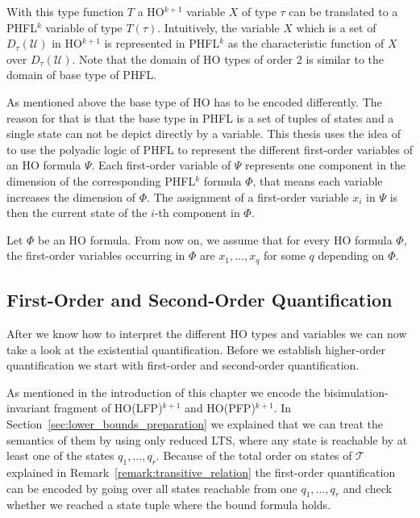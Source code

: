 With this type function $T$ a HO$^{k + 1}$ variable $X$ of type $\tau$ can be translated to a PHFL$^k$ variable
of type $T(\tau)$. Intuitively, the variable $X$ which is a set of $D_\tau(\mathcal{U})$ in HO$^{k+1}$ is represented
in PHFL$^k$ as the characteristic function of $X$ over $D_\tau(\mathcal{U})$. Note that the domain of HO types
of order $2$ is similar to the domain of base type of PHFL.

As mentioned above the base type of HO has to be encoded differently. The reason for that is that the base type in PHFL is a
set of tuples of states and a single state can not be depict directly by a variable. This thesis uses the
idea of~\cite{lange2014capturing} to use the polyadic logic of PHFL to represent the different first-order variables of an HO formula
$\Psi$. Each first-order variable of $\Psi$ represents one component in the dimension of the 
corresponding PHFL$^k$ formula $\Phi$, that
means each variable increases the dimension of $\Phi$. The assignment of a first-order 
variable $x_i$ in $\Psi$ is then the current state of the $i$-th component in $\Phi$.

Let $\Phi$ be an HO formula. From now on, we assume that for every HO formula $\Phi$, the first-order variables occurring in $\Phi$ are 
$x_1, \dots, x_q$ for some $q$ depending on $\Phi$.

\subsection{First-Order and Second-Order Quantification}\label{subsec:existentialQuantifiers}

After we know how to interpret the different HO types and variables we can now take a look at the existential quantification. Before we establish higher-order quantification we start with first-order and second-order quantification.

As mentioned in the introduction of this chapter we encode the bisimula\-tion-invariant fragment of HO(LFP)$^{k + 1}$ and HO(PFP)$^{k+1}$. In Section~\ref{sec:lower_bounds_preparation}  we explained that we can treat the semantics of them by using only reduced LTS, where any state is reachable by at least one of the states $q_1, \dots, q_r$. Because of the total order on states of $\mathcal{T}$ explained in Remark~\ref{remark:transitive_relation} the first-order
quantification can be encoded by going over all states reachable from one $q_1, \dots, q_r$ and check whether we
reached a state tuple where the bound formula holds.

